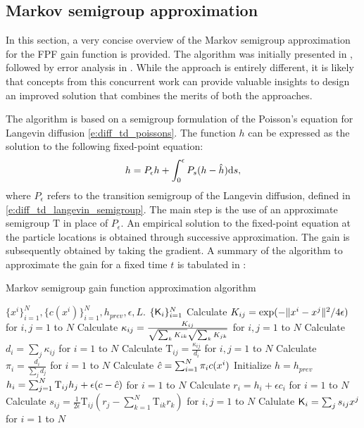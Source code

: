 \subsection{Markov semigroup approximation}
\label{s:coifman}
In this section, a very concise overview of the Markov semigroup approximation for the FPF gain function is provided. The algorithm was initially presented in \cite{tagmeh16}, followed by error analysis in \cite{tagmehmey17}. While the approach is entirely different, it is likely that concepts from this concurrent work can provide valuable insights to design an improved solution that combines the merits of both the approaches. 

The algorithm is based on a semigroup formulation of the Poisson's equation for Langevin diffusion \eqref{e:diff_td_poissons}. The function $h$ can be expressed as the solution to the following fixed-point equation:
\begin{equation}
h = P_\epsilon h + \int_0^\epsilon P_s (h - {\hat h}) \text{d} s,
\end{equation}
where $P_\epsilon$ refers to the transition semigroup of the Langevin diffusion, defined in \eqref{e:diff_td_langevin_semigroup}. The main step is the use of an approximate semigroup $\text{T}$ in place of $P_\epsilon$.
An empirical solution to the fixed-point equation at the particle locations is obtained through successive approximation. The gain is subsequently obtained by taking the gradient.  A summary of the algorithm to approximate the gain for a fixed time $t$ is tabulated in :
\begin{algorithm}{Markov semigroup gain function approximation algorithm}
\begin{algorithmic}[1]
	\Require $\{x^i\}_{i=1}^N, \{c(x^i)\}_{i=1}^N, h_{prev}, \epsilon, L$.
	\Ensure $\{\text{\sf K}_i\}_{i=1}^N$
	\State Calculate $K_{ij} = \exp(-\|x^i - x^j\|^2/ 4\epsilon)$ for $i,j = 1$ to $N$  
	\State Calculate $\kappa_{ij} = \frac{K_{ij}}{\sqrt{\sum_k K_{ik}}\sqrt{\sum_k K_{jk}}}$ for $i,j =1$ to $N$
	\State Calculate $d_i = \sum_j \kappa_{ij}$ for $i=1$ to $N$
	\State Calculate $\text{T}_{ij} = \frac{\kappa_{ij}}{d_i}$ for $i,j = 1$ to $N$ 
	\State Calculate $\pi_i = \frac{d_i}{\sum_j d_j}$ for $i=1$ to $N$
	\State Calculate $ {\hat c} = \sum_{i = 1}^N \pi_i c(x^i)$
	\State Initialize $h =h_{prev}$
		 \State $h_i = \sum_{j=1}^N \text{T}_{ij} h_j + \epsilon (c - {\hat c})$ for $i=1$ to $N$ 
		\EndFor
	\State Calculate $r_i = h_i + \epsilon c_i$ for $i=1$ to $N$
	\State Calculate $s_{ij} = \frac{1}{2\epsilon} \text{T}_{ij} (r_j - \sum_{k=1}^N \text{T}_{ik} r_k)$ for $i,j=1$ to $N$ 
	\State Calulate $\text{\sf K}_i  = \sum_j s_{ij} x^j$ for $i =1$ to $N$ 
	\label{alg:coifman}
\end{algorithmic}
\end{algorithm}

